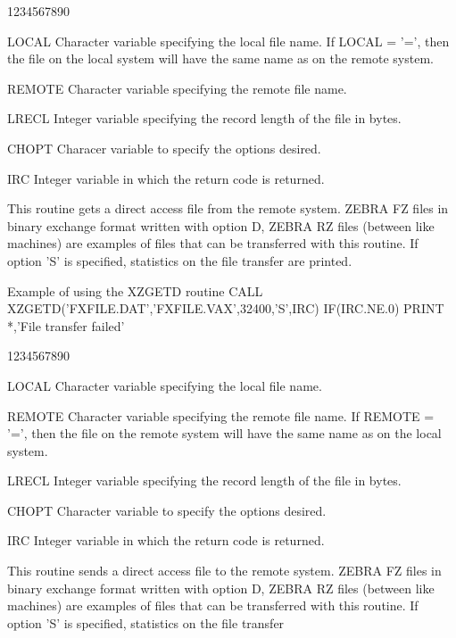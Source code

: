 \begin{DLtt}{1234567890}
\item[LOCAL]Character variable specifying the local file name.
If LOCAL = '=', then the file on the local system will
have the same name as on the remote system.
\item[REMOTE]Character variable specifying the remote file name.
\item[LRECL]Integer variable specifying the record length of the file in bytes.
\item[CHOPT]Characer variable to specify the options desired.
\item[IRC]Integer variable in which the return code is returned.
\end{DLtt}
\par
This routine gets a direct access  file from the remote system.
ZEBRA FZ files in binary exchange format written with option D,
ZEBRA RZ files (between
like machines)
are examples of files that can be transferred with this routine.
If option 'S' is specified, statistics on the file transfer
are printed.
\begin{XMPt}{Example of using the XZGETD routine}
      CALL XZGETD('FXFILE.DAT','FXFILE.VAX',32400,'S',IRC)
      IF(IRC.NE.0) PRINT *,'File transfer failed'
\end{XMPt}
\begin{DLtt}{1234567890}
\item[LOCAL]Character variable specifying the local file name.
\item[REMOTE]Character variable specifying the remote file name.
If REMOTE = '=', then the file on the remote system will
have the same name as on the local system.
\item[LRECL]Integer variable specifying the record length of the file in bytes.
\item[CHOPT]Character variable to specify the options desired.
\item[IRC]Integer variable in which the return code is returned.
\end{DLtt}
\par
This routine sends a direct access file to the remote system.
ZEBRA FZ files in binary exchange format written with option D,
ZEBRA RZ files (between
like machines)
are examples of files that can be transferred with this routine.
If option 'S' is specified, statistics on the file transfer
